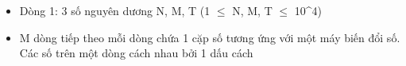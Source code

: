 \begin{itemize}
	\item Dòng 1: 3 số nguyên dương N, M, T (1  $\le$  N, M, T  $\le$  10^4)
	\item M dòng tiếp theo mỗi dòng chứa 1 cặp số tương ứng với một máy biến đổi số. Các số trên một dòng cách nhau bởi 1 dấu cách
\end{itemize}

\